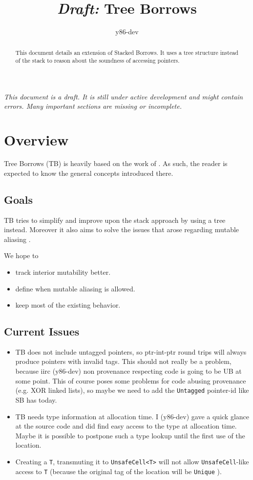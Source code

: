 \documentclass[]{article}
\title{\textit{Draft:} Tree Borrows}
\author{y86-dev}
\newcommand{\UNQ}{\texttt{Unique} }
\begin{document}
\maketitle

\textit{This document is a draft. It is still under active development and might contain errors. Many important sections are missing or incomplete.}

\begin{abstract}
This document details an extension of Stacked Borrows. It uses a tree structure instead of the stack to reason
about the soundness of accessing pointers.
\end{abstract}

\section{Overview}
Tree Borrows (TB) is heavily based on the work of \cite{stackedborrows}.
As such, the reader is expected to know the general concepts introduced there.
\subsection{Goals}
TB tries to simplify and improve upon the stack approach by using a tree instead.
Moreover it also aims to solve the issues that arose regarding mutable aliasing \cite{mutable_aliasing}.

We hope to
\begin{itemize}
    \item track interior mutability better.
    \item define when mutable aliasing is allowed.
    \item keep most of the existing behavior.
\end{itemize}

\subsection{Current Issues}
\begin{itemize}
    \item TB does not include untagged pointers, so ptr-int-ptr round trips will always produce pointers with invalid tags. This should not really be a problem, because iirc (y86-dev) non provenance respecting code is going to be UB at some point. This of course poses some problems for code abusing provenance (e.g. XOR linked lists), so maybe we need to add the \texttt{Untagged} pointer-id like SB has today.
    \item TB needs type information at allocation time. I (y86-dev) gave a quick glance at the source code and did find easy access to the type at allocation time. Maybe it is possible to postpone such a type lookup until the first use of the location.
    \item Creating a \texttt{T}, transmuting it to \texttt{UnsafeCell<T>} will not allow \texttt{UnsafeCell}-like access to \texttt{T} (because the original tag of the location will be \UNQ).
\end{itemize}
\end{document}
